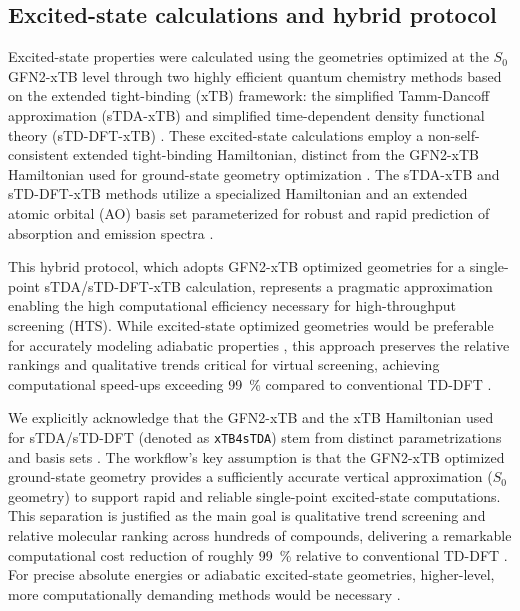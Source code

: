 \documentclass[journal=jcisd8,manuscript=article,keywords=true]{achemso}
\begin{document}
\subsection{Excited-state calculations and hybrid protocol}\label{sec:excited_state}

Excited-state properties were calculated using the geometries optimized at the $S_0$ GFN2-xTB level through two highly efficient quantum chemistry methods based on the extended tight-binding (xTB) framework: the simplified Tamm-Dancoff approximation (sTDA-xTB) \cite{Grimme2016} and simplified time-dependent density functional theory (sTD-DFT-xTB) \cite{Grimme2021, Wergifosse2024}. These excited-state calculations employ a non-self-consistent extended tight-binding Hamiltonian, distinct from the GFN2-xTB Hamiltonian used for ground-state geometry optimization \cite{Grimme2017}. The sTDA-xTB and sTD-DFT-xTB methods utilize a specialized Hamiltonian and an extended atomic orbital (AO) basis set parameterized for robust and rapid prediction of absorption and emission spectra \cite{bannwarth2021extended}.

This hybrid protocol, which adopts GFN2-xTB optimized geometries for a single-point
sTDA/sTD-DFT-xTB calculation, represents a pragmatic approximation enabling the high
computational efficiency necessary for high-throughput screening (HTS). While
excited-state optimized geometries would be preferable for accurately modeling adiabatic
properties \cite{Froitzheim2022, Mewes2018}, this approach preserves the relative rankings
and qualitative trends critical for virtual screening, achieving computational speed-ups
exceeding \qty{99}{\percent} compared to conventional TD-DFT \cite{Konidena_2021}.

We explicitly acknowledge that the GFN2-xTB and the xTB Hamiltonian used for sTDA/sTD-DFT
(denoted as \texttt{xTB4sTDA}) stem from distinct parametrizations and basis sets
\cite{Ma_2019, Wei_2022, Zeng_2019}. The workflow’s key assumption is that the GFN2-xTB
optimized ground-state geometry provides a sufficiently accurate vertical approximation
($S_0$ geometry) to support rapid and reliable single-point excited-state computations.
This separation is justified as the main goal is qualitative trend screening and relative
molecular ranking across hundreds of compounds, delivering a remarkable computational cost
reduction of roughly \qty{99}{\percent} relative to conventional TD-DFT
\cite{Konidena_2021, Gomez-Bombarelli2016}. For precise absolute energies or adiabatic
excited-state geometries, higher-level, more computationally demanding methods would be
necessary \cite{Wang_2021}.
\end{document}
